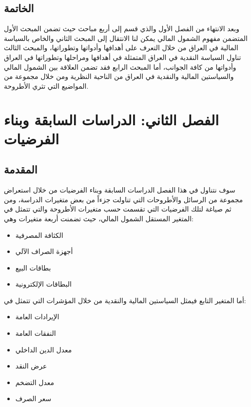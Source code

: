 \documentclass[10pt,a4paper]{report}
\begin{document}
\begin{doublespacing}
\section*{الخاتمة}
وبعد الانتهاء من الفصل الأول والذي قسم إلى أربع مباحث حيث تضمن المبحث الأول المتضمن مفهوم الشمول المالي يمكن لنا الانتقال إلى المبحث الثاني والخاص بالسياسة المالية في العراق من خلال التعرف على أهدافها وأدواتها وتطوراتها، والمبحث الثالث تناول السياسة النقدية في العراق المتمثلة في أهدافها ومراحلها وتطوراتها في العراق وأدواتها من كافة الجوانب، أما المبحث الرابع فقد تضمن العلاقة بين الشمول المالي والسياستين المالية والنقدية في العراق من الناحية النظرية ومن خلال مجموعة من المواضيع التي تثري الأطروحة.
\clearpage
\chapter{الفصل الثاني: الدراسات السابقة وبناء الفرضيات}
\thispagestyle{empty}
\clearpage
\section*{المقدمة}
سوف نتناول في هذا الفصل الدراسات السابقة وبناء الفرضيات من خلال استعراض مجموعة من الرسائل والأطروحات التي تناولت جزءاً من بعض متغيرات الدراسة، ومن ثم صياغة لتلك الفرضيات التي تقسمت حسب متغيرات الأطروحة والتي تتمثل في المتغير المستقل الشمول المالي، حيث تضمنت أربعة متغيرات وهي:
\begin{itemize}
	\item الكثافة المصرفية
	\item أجهزة الصراف الآلي
	\item بطاقات البيع
	\item البطاقات الإلكترونية
\end{itemize}
أما المتغير التابع فيمثل السياستين المالية والنقدية من خلال المؤشرات التي تتمثل في:
\begin{itemize}
	\item الإيرادات العامة
	\item النفقات العامة
	\item معدل الدين الداخلي
	\item عرض النقد
	\item معدل التضخم
	\item سعر الصرف
\end{itemize}

\end{doublespacing}
\end{document}
